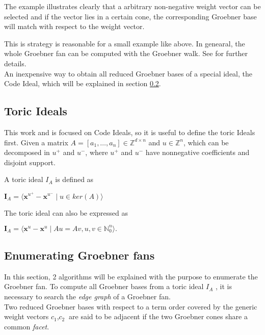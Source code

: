 The example illustrates clearly that a arbitrary non-negative weight vector can be selected and if the vector lies in a certain cone, the corresponding Groebner base will match with respect to the weight vector.  


This is strategy is reasonable for a small example like above.
In genearal, the whole Groebner fan can be computed with the Groebner walk.
See \cite{coxOshea} for further details.\\
An inexpensive way to obtain all reduced Groebner bases of a special ideal, the Code Ideal, which will be explained in section \ref{subsec:enumerate}.

\subsection{Toric Ideals}
\label{subsec:toric}
This work and is focused on Code Ideals, so it is useful to define the toric Ideals first. Given a matrix $A =\left[a_{1},\dots, a_{n}  \right] \in \mathbb{Z}^{d \times n } $ and $u \in \mathbb{Z}^{n}$, which can be decomposed in $u^{+} $ and $u^{-}$, where $u^{+} $ and $u^{-}$ have nonnegative coefficients and disjoint support.

\begin{env_definition}
\cite{dueckjournal} A toric ideal $I_{A}$ is defined as
\begin{center}
$ \textbf{I}_{A} = \langle \textbf{x}^{u^{+}} - \textbf{x}^{u^{-}} \mid u \in ker \left(  A \right) \rangle  $
\end{center}


\end{env_definition}

The toric ideal can also be expressed as
\begin{center}
$ \textbf{I}_{A} =  \langle \textbf{x}^{u} - \textbf{x}^{u} \mid Au = Av, u,v \in \mathbb{N}^{n}_{0} \rangle .$
\end{center}



\subsection{Enumerating Groebner fans}
\label{subsec:enumerate}

In this section, 2 algorithms will be explained with the  purpose to enumerate the Groebner fan.
To compute all Groebner bases from a toric ideal $I_A$ , it is necessary to search the \textit{edge graph} of a Groebner fan.\\
Two reduced Groebner bases with respect to a term order covered by the generic weight vectors $c_{1}$,$c_{2}~$ are said to be adjacent if the two Groebner cones share a common \textit{facet}.

